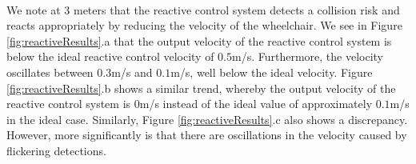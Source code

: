\paragraph{}We note at $3$ meters that the reactive control system detects a collision risk and reacts appropriately by reducing the velocity of the wheelchair. We see in Figure \ref{fig:reactiveResults}.a that the output velocity of the reactive control system is below the ideal reactive control velocity of $0.5$m/s. Furthermore, the velocity oscillates between $0.3$m/s and $0.1$m/s, well below the ideal velocity. Figure \ref{fig:reactiveResults}.b shows a similar trend, whereby the output velocity of the reactive control system is $0$m/s instead of the ideal value of approximately $0.1$m/s in the ideal case. Similarly, Figure \ref{fig:reactiveResults}.c also shows a discrepancy. However, more significantly is that there are oscillations in the velocity caused by flickering detections. 

